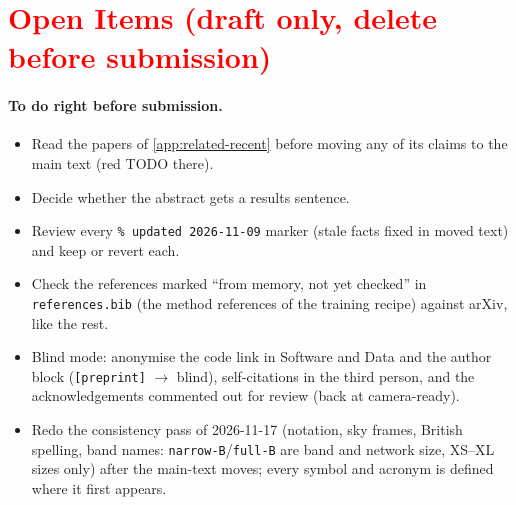 \clearpage
\section*{\textcolor{red}{Open Items (draft only, delete before submission)}}
\label{app:open-items}
{\color{red}
\paragraph{To do right before submission.}
\begin{itemize}
  \item Read the papers of \cref{app:related-recent} before moving any of its claims to the main text
    (red TODO there).
  \item Decide whether the abstract gets a results sentence.
  \item Review every \texttt{\% updated 2026-11-09} marker (stale facts fixed in moved text) and
    keep or revert each.
  \item Check the references marked ``from memory, not yet checked'' in \texttt{references.bib}
    (the method references of the training recipe) against arXiv, like the rest.
  \item Blind mode: anonymise the code link in Software and Data and the author block (\texttt{[preprint]}
    $\to$ blind), self-citations in the third person,
    and the acknowledgements commented out for review (back at camera-ready).
  \item Redo the consistency pass of 2026-11-17 (notation, sky frames, British spelling, band names:
    \texttt{narrow-B}/\texttt{full-B} are band and network size, XS--XL sizes only) after the main-text
    moves; every symbol and acronym is defined where it first appears.
\end{itemize}
}
